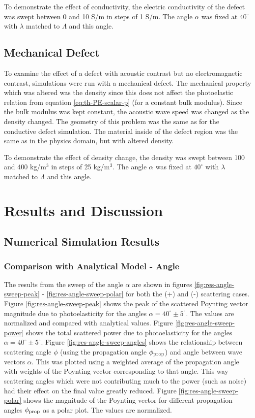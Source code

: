 \documentclass[11pt,twoside]{eitExjobb}
\begin{document}
	To demonstrate the effect of conductivity, the electric conductivity of the defect was swept between 0 and 10 S/m in steps of 1 S/m. The angle $\alpha$ was fixed at $40^\circ$ with $\lambda$ matched to $\Lambda$ and this angle.
	
	\section{Mechanical Defect}
	To examine the effect of a defect with acoustic contrast but no electromagnetic contrast, simulations were run with a mechanical defect. The mechanical property which was altered was the density since this does not affect the photoelastic relation from equation \eqref{eq:th-PE-scalar-p} (for a constant bulk modulus). Since the bulk modulus was kept constant, the acoustic wave speed was changed as the density changed. The geometry of this problem was the same as for the conductive defect simulation. The material inside of the defect region was the same as in the physics domain, but with altered density.
	
	To demonstrate the effect of density change, the density was swept between 100 and 400 kg/m$^3$ in steps of 25 kg/m$^3$. The angle $\alpha$ was fixed at $40^\circ$ with $\lambda$ matched to $\Lambda$ and this angle.
	
	\chapter{Results and Discussion}
	
	\section{Numerical Simulation Results}
	
	\subsection{Comparison with Analytical Model - Angle}
	The results from the sweep of the angle $\alpha$ are shown in figures \ref{fig:res-angle-sweep-peak} - \ref{fig:res-angle-sweep-polar} for both the (+) and (-) scattering cases. Figure \ref{fig:res-angle-sweep-peak} shows the peak of the scattered Poynting vector magnitude due to photoelasticity for the angles $\alpha = 40^\circ \pm 5^\circ$. The values are normalized and compared with analytical values. Figure \ref{fig:res-angle-sweep-power} shows the total scattered power due to photoelasticity for the angles $\alpha = 40^\circ \pm 5^\circ$. Figure \ref{fig:res-angle-sweep-angles} shows the relationship between scattering angle $\phi$ (using the propagation angle $\phi_{\mathrm{prop}}$) and angle between wave vectors $\alpha$. This was plotted using a weighted average of the propagation angle with weights of the Poynting vector corresponding to that angle. This way scattering angles which were not contributing much to the power (such as noise) had their effect on the final value greatly reduced. Figure \ref{fig:res-angle-sweep-polar} shows the magnitude of the Poynting vector for different propagation angles $\phi_{\mathrm{prop}}$ as a polar plot. The values are normalized.
	
\end{document}
